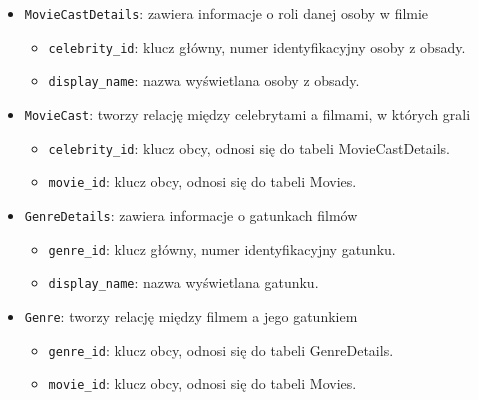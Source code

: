\documentclass[../main.tex]{subfiles}
\begin{document}
\begin{itemize}
\begin{itemize}
	      \end{itemize}
	\item \texttt{MovieCastDetails}: zawiera informacje o roli danej osoby w filmie
	      \begin{itemize}
		      \item \texttt{celebrity\_id}: klucz główny, numer identyfikacyjny osoby z obsady.
		      \item \texttt{display\_name}: nazwa wyświetlana osoby z obsady.
	      \end{itemize}
	\item \texttt{MovieCast}: tworzy relację między celebrytami a filmami, w których grali
	      \begin{itemize}
		      \item \texttt{celebrity\_id}: klucz obcy, odnosi się do tabeli MovieCastDetails.
		      \item \texttt{movie\_id}: klucz obcy, odnosi się do tabeli Movies.
	      \end{itemize}
	\item \texttt{GenreDetails}: zawiera informacje o gatunkach filmów
	      \begin{itemize}
		      \item \texttt{genre\_id}: klucz główny, numer identyfikacyjny gatunku.
		      \item \texttt{display\_name}: nazwa wyświetlana gatunku.
	      \end{itemize}
	\item \texttt{Genre}: tworzy relację między filmem a jego gatunkiem
	      \begin{itemize}
		      \item \texttt{genre\_id}: klucz obcy, odnosi się do tabeli GenreDetails.
		      \item \texttt{movie\_id}: klucz obcy, odnosi się do tabeli Movies.
	      \end{itemize}
\end{itemize}
\end{document}
